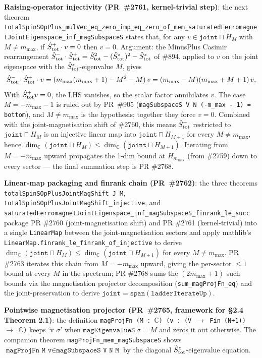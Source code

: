 \documentclass[a4paper,11pt]{article}
\begin{document}
\textbf{Raising-operator injectivity (PR~\#2761, kernel-trivial
step)}: the next theorem
\texttt{totalSpinSOpPlus\_mulVec\_eq\_zero\_imp\_eq\_zero\_of\_mem\_saturatedFerromagnetJointEigenspace\_inf\_magSubspaceS}
states that, for any
$v \in \texttt{joint} \sqcap H_M$ with $M \neq m_{\max}$, if
$\hat S^+_{\rm tot} \cdot v = 0$ then $v = 0$. Argument: the
MinusPlus Casimir rearrangement
$\hat S^-_{\rm tot} \cdot \hat S^+_{\rm tot} =
\hat S_{\rm tot}^2 - (\hat S^z_{\rm tot})^2 - \hat S^z_{\rm tot}$
of \#894, applied to $v$ on the joint eigenspace with the
$\hat S^z_{\rm tot}$-eigenvalue $M$, gives
\[
  \hat S^-_{\rm tot} \cdot \hat S^+_{\rm tot} \cdot v
  = (m_{\max}(m_{\max}+1) - M^2 - M)\,v
  = (m_{\max} - M)(m_{\max} + M + 1)\,v.
\]
With $\hat S^+_{\rm tot} v = 0$, the LHS vanishes, so the scalar
factor annihilates $v$. The case $M = -m_{\max} - 1$ is ruled out by
PR~\#905 (\texttt{magSubspaceS V N (-m\_max - 1) = bottom}), and
$M \neq m_{\max}$ is the hypothesis; together they force $v = 0$.
Combined with the joint-magnetisation shift of \#2760, this means
$\hat S^+_{\rm tot}$ restricted to
$\texttt{joint} \sqcap H_M$ is an injective linear map into
$\texttt{joint} \sqcap H_{M+1}$ for every $M \neq m_{\max}$, hence
$\dim_\mathbb{C}(\texttt{joint} \sqcap H_M) \le
\dim_\mathbb{C}(\texttt{joint} \sqcap H_{M+1})$. Iterating from
$M = -m_{\max}$ upward propagates the 1-dim bound at $H_{m_{\max}}$
(from \#2759) down to every sector — the final summation step is
PR \#2768.

\textbf{Linear-map packaging and finrank chain (PR~\#2762)}: the
three theorems
\texttt{totalSpinSOpPlusJointMagShift J M},
\texttt{totalSpinSOpPlusJointMagShift\_injective}, and
\texttt{saturatedFerromagnetJointEigenspace\_inf\_magSubspaceS\_finrank\_le\_succ}
package PR \#2760 (joint-magnetisation shift) and PR \#2761
(kernel-trivial) into a single \texttt{LinearMap} between the
joint-magnetisation sectors and apply mathlib's
\texttt{LinearMap.finrank\_le\_finrank\_of\_injective} to derive
$\dim_\mathbb{C}(\texttt{joint} \sqcap H_M) \le
\dim_\mathbb{C}(\texttt{joint} \sqcap H_{M+1})$ for every
$M \neq m_{\max}$. PR \#2763 iterates this chain from $M = -m_{\max}$ upward, giving
the per-sector $\le 1$ bound at every $M$ in the spectrum; PR \#2768
sums the $(2m_{\max}+1)$ such bounds via the magnetisation projector
decomposition (\texttt{sum\_magProjFn\_eq}) and the joint-preservation
to derive $\texttt{joint} = \texttt{span}(\texttt{ladderIterateUp})$.

\textbf{Pointwise magnetisation projector (PR~\#2765, framework
for §2.4 Theorem 2.1)}: the definition
\texttt{magProjFn (M : $\mathbb{C}$) (v : (V $\to$ Fin (N+1)) $\to$ $\mathbb{C}$)}
keeps `v $\sigma$' when
$\texttt{magEigenvalueS}~\sigma = M$ and zeros it out otherwise.
The companion theorem
\texttt{magProjFn\_mem\_magSubspaceS} shows
$\texttt{magProjFn M v} \in \texttt{magSubspaceS V N M}$ by the
diagonal $\hat S^z_{\rm tot}$-eigenvalue equation.
\end{document}
